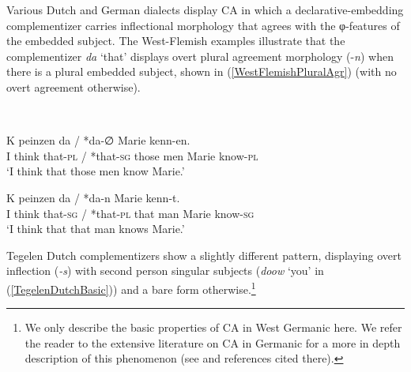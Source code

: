 \documentclass[output=paper
,modfonts
,nonflat
]{langsci/langscibook}
\begin{document}
Various Dutch and German dialects display CA in which a declarative-em\-bedd\-ing complementizer carries inflectional morphology that agrees with the φ-fea\-tures of the embedded subject. The West-Flemish examples illustrate that the complementizer \textit{da} `that' displays overt plural agreement morphology (-\textit{n}) when there is a plural embedded subject, shown in (\ref{WestFlemishPluralAgr}) (with no overt agreement otherwise). 

\ea \label{InitialWestFlemishExample}
\\
\begin{xlist}

\ex \label{WestFlemishPluralAgr}
\gll K peinzen da / *da{-∅}  Marie kenn-en.\\
I 	think	that-\textsc{pl}	/	*that-\textsc{sg}	{those men}	Marie	know-\textsc{pl} \\
\glt `I think that those men know Marie.' 	

\ex \label{WestFlemishNo3rdAgr}
\gll K peinzen da / *da-n  Marie kenn-t.\\
I think that-\textsc{sg} / *that-\textsc{pl} {that man} Marie know-\textsc{sg} \\
\glt `I think that that man knows Marie.' 	

\end{xlist}

\z
\noindent Tegelen Dutch complementizers show a slightly different pattern, displaying overt inflection (\textit{-s}) with second person singular subjects (\textit{doow} `you' in (\ref{TegelenDutchBasic})) and a bare form otherwise.\footnote{We only describe the basic properties of CA in West Germanic here. We refer the reader to the extensive literature on CA in Germanic for a more in depth description of this phenomenon (see \citealt{vanKoppen:2017} and references cited there).}
\end{document}
